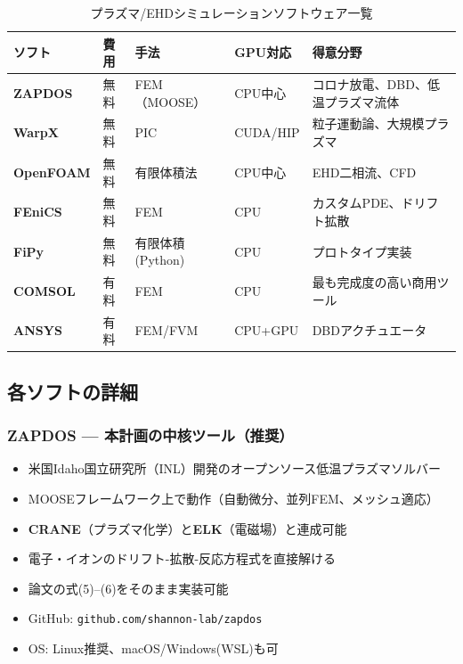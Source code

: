 \documentclass[12pt,a4paper]{ltjsarticle}
\begin{document}
\begin{table}[h]
\centering\sffamily\small
\caption{プラズマ/EHDシミュレーションソフトウェア一覧}
\begin{tabular}{@{}p{2cm}p{1.5cm}p{2.5cm}p{2cm}p{3cm}@{}}
\toprule
\textbf{ソフト} & \textbf{費用} & \textbf{手法} & \textbf{GPU対応} & \textbf{得意分野} \\
\midrule
\textbf{ZAPDOS} & 無料 & FEM（MOOSE） & CPU中心 & コロナ放電、DBD、低温プラズマ流体 \\
\textbf{WarpX} & 無料 & PIC & CUDA/HIP & 粒子運動論、大規模プラズマ \\
\textbf{OpenFOAM} & 無料 & 有限体積法 & CPU中心 & EHD二相流、CFD \\
\textbf{FEniCS} & 無料 & FEM & CPU & カスタムPDE、ドリフト拡散 \\
\textbf{FiPy} & 無料 & 有限体積(Python) & CPU & プロトタイプ実装 \\
\textbf{COMSOL} & 有料 & FEM & CPU & 最も完成度の高い商用ツール \\
\textbf{ANSYS} & 有料 & FEM/FVM & CPU+GPU & DBDアクチュエータ \\
\bottomrule
\end{tabular}
\end{table}

\subsection{各ソフトの詳細}

\subsubsection{ZAPDOS --- 本計画の中核ツール（推奨）}

\begin{successbox}
\begin{itemize}[leftmargin=2em]
  \item 米国Idaho国立研究所（INL）開発のオープンソース低温プラズマソルバー
  \item MOOSEフレームワーク上で動作（自動微分、並列FEM、メッシュ適応）
  \item \textbf{CRANE}（プラズマ化学）と\textbf{ELK}（電磁場）と連成可能
  \item 電子・イオンのドリフト-拡散-反応方程式を直接解ける
  \item 論文の式(5)--(6)をそのまま実装可能
  \item GitHub: \texttt{github.com/shannon-lab/zapdos}
  \item OS: Linux推奨、macOS/Windows(WSL)も可
\end{itemize}
\end{successbox}
\end{document}
